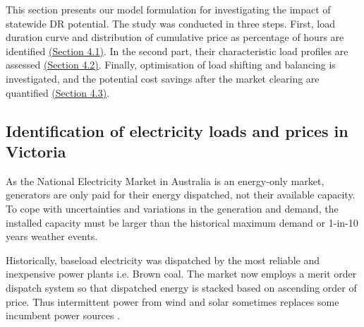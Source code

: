 \documentclass{pasa}%
\begin{document}
This section presents our model formulation for investigating the impact of statewide DR potential. The study was conducted in three steps. First, load duration curve and distribution of cumulative price as percentage of hours are identified \hyperref[sec:model4.1]{(Section 4.1)}. In the second part, their characteristic load profiles are assessed \hyperref[sec:model4.2]{(Section 4.2)}. 
Finally, optimisation of load shifting and balancing is investigated, and the potential cost savings after the market clearing are quantified \hyperref[sec:model4.3]{(Section 4.3)}. 

\subsection{Identification of electricity loads and prices in Victoria}
\label{sec:model4.1}

As the National Electricity Market in Australia is  an energy-only market, generators are only paid for their energy dispatched, not  their available capacity. To cope with uncertainties and variations in the generation and demand, the installed capacity must be  larger than the historical maximum demand or 1-in-10 years weather events.
 
Historically, baseload electricity was dispatched by the most reliable and inexpensive power plants i.e. Brown coal. The market  now employs a merit order dispatch system so that   dispatched energy is stacked based on ascending order of price. Thus intermittent power from wind and solar  sometimes replaces some incumbent power sources \cite{aer2010}. 
\end{document}
